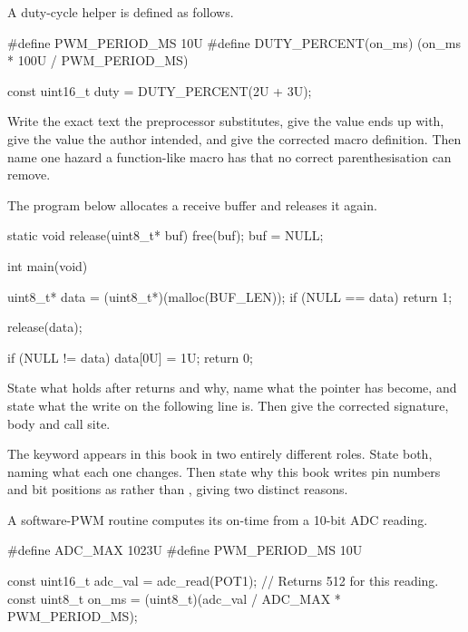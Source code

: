 \label{exa:q:1}

 A duty-cycle helper is defined as follows.

\begin{ccode}
#define PWM_PERIOD_MS 10U
#define DUTY_PERCENT(on_ms) (on_ms * 100U / PWM_PERIOD_MS)

const uint16_t duty = DUTY_PERCENT(2U + 3U);
\end{ccode}

\noindent Write the exact text the preprocessor substitutes, give the value  ends up
with, give the value the author intended, and give the corrected macro definition. Then name one
hazard a function-like macro has that no correct parenthesisation can remove. 

 The program below allocates a receive buffer and releases it again.

\begin{ccode}
static void release(uint8_t* buf)
{
    free(buf);
    buf = NULL;
}

int main(void)
{
    uint8_t* data = (uint8_t*)(malloc(BUF_LEN));
    if (NULL == data) { return 1; }

    release(data);

    if (NULL != data) { data[0U] = 1U; }
    return 0;
}
\end{ccode}

\noindent State what  holds after  returns and why, name what the pointer
has become, and state what the write on the following line is. Then give the corrected signature,
body and call site. 

 The keyword  appears in this book in two entirely different roles. State
both, naming what each one changes. Then state why this book writes pin numbers and bit positions
as  rather than , giving two distinct
reasons. 

 A software-PWM routine computes its on-time from a 10-bit ADC reading.

\begin{ccode}
#define ADC_MAX 1023U
#define PWM_PERIOD_MS 10U

const uint16_t adc_val = adc_read(POT1);              // Returns 512 for this reading.
const uint8_t on_ms    = (uint8_t)(adc_val / ADC_MAX * PWM_PERIOD_MS);
\end{ccode}

